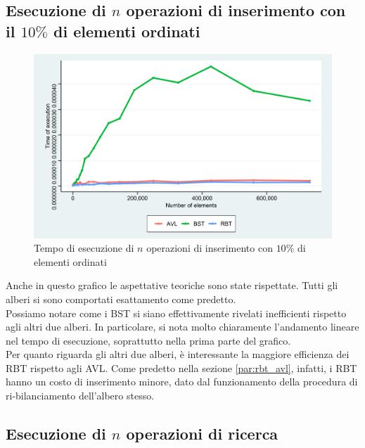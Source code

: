 \documentclass{article}
\begin{document}
	\newpage
	
	\subsection{Esecuzione di $n$ operazioni di inserimento con il $10\%$ di elementi ordinati}
	\label{subsection:n_op_ins_ord}
		
	\begin{figure}[h!]
		\centering
  		\includegraphics[width=1 \columnwidth]{Grafici/Grafico_All_ordered.png}
  		\caption{Tempo di esecuzione di $n$ operazioni di inserimento con $10\%$ di elementi ordinati}
  		\label{fig:graph2}
	\end{figure}
	
	Anche in questo grafico le aspettative teoriche sono state rispettate. Tutti gli alberi si sono comportati esattamento come predetto. \\
	Possiamo notare come i BST si siano effettivamente rivelati inefficienti rispetto agli altri due alberi. In particolare, si nota molto chiaramente l'andamento lineare nel tempo di esecuzione, soprattutto nella prima parte del grafico. \\
	Per quanto riguarda gli altri due alberi, è interessante la maggiore efficienza dei RBT rispetto agli AVL. Come predetto nella sezione \ref{par:rbt_avl}, infatti, i RBT hanno un costo di inserimento minore, dato dal funzionamento della procedura di ri-bilanciamento dell'albero stesso.
	
	\newpage
	
	\subsection{Esecuzione di $n$ operazioni di ricerca}
	\label{subsection:n_op_ric}
		
\end{document}
